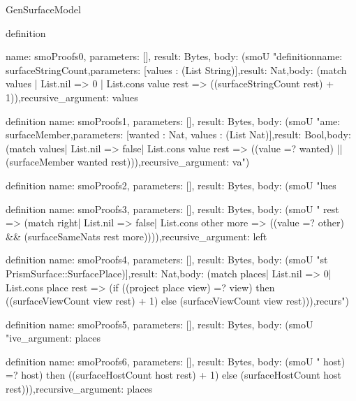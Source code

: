 \begin{lexlean}{GenSurfaceModel}
\begin{semanticmodule}
definition{
  name: smoProofs0,
  parameters: [],
  result: Bytes,
  body: (smoU "definition{\n  name: surfaceStringCount,\n  parameters: [values : (List String)],\n  result: Nat,\n  body: (match values | List.nil => 0 | List.cons value rest => ((surfaceStringCount rest) + 1)),\n  recursive_argument: values\n}\n{}

definition{
  name: smoProofs1,
  parameters: [],
  result: Bytes,
  body: (smoU "ame: surfaceMember,\n  parameters: [wanted : Nat, values : (List Nat)],\n  result: Bool,\n  body: (match values\n    | List.nil => false\n    | List.cons value rest => ((value =? wanted) || (surfaceMember wanted rest))),\n  recursive_argument: va")
}

definition{
  name: smoProofs2,
  parameters: [],
  result: Bytes,
  body: (smoU "lues\n}\n{}

definition{
  name: smoProofs3,
  parameters: [],
  result: Bytes,
  body: (smoU " rest => (match right\n      | List.nil => false\n      | List.cons other more => ((value =? other) && (surfaceSameNats rest more)))),\n  recursive_argument: left\n}\n\ndefinition{\n  name: surfaceViewCount,\n  parameters: [view : Nat, places : (Li")
}

definition{
  name: smoProofs4,
  parameters: [],
  result: Bytes,
  body: (smoU "st PrismSurface::SurfacePlace)],\n  result: Nat,\n  body: (match places\n    | List.nil => 0\n    | List.cons place rest => (if ((project place view) =? view) then ((surfaceViewCount view rest) + 1) else (surfaceViewCount view rest))),\n  recurs")
}

definition{
  name: smoProofs5,
  parameters: [],
  result: Bytes,
  body: (smoU "ive_argument: places\n}\n{}

definition{
  name: smoProofs6,
  parameters: [],
  result: Bytes,
  body: (smoU " host) =? host) then ((surfaceHostCount host rest) + 1) else (surfaceHostCount host rest))),\n  recursive_argument: places\n}\n{}

}
\end{semanticmodule}
\end{lexlean}
